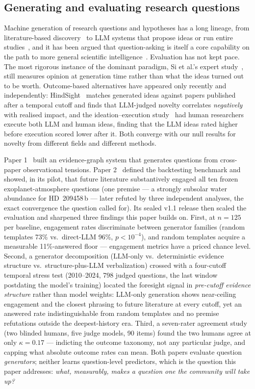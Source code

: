 \documentclass[11pt]{article}
\begin{document}
\subsection{Generating and evaluating research questions}

Machine generation of research questions and hypotheses has a long lineage,
from literature-based discovery~\cite{swanson1986} to LLM systems that
propose ideas or run entire studies~\cite{lu2024,wang2024,baek2024}, and it
has been argued that question-asking is itself a core capability on the path
to more general scientific intelligence~\cite{kitano2021}. Evaluation has
not kept pace. The most rigorous instance of the dominant paradigm, Si et
al.'s expert study~\cite{si2024}, still measures opinion at generation time
rather than what the ideas turned out to be worth. Outcome-based
alternatives have appeared only recently and independently:
HindSight~\cite{hindsight2026} matches generated ideas against papers
published after a temporal cutoff and finds that LLM-judged novelty
correlates \emph{negatively} with realised impact, and the
ideation--execution study~\cite{ideationgap2025} had human researchers
execute both LLM and human ideas, finding that the LLM ideas rated higher
before execution scored lower after it. Both converge with our null results
for novelty from different fields and different methods.

Paper 1~\cite{paper1} built an evidence-graph system that generates
questions from cross-paper observational tensions. Paper
2~\cite{paper2} defined the backtesting benchmark and showed, in its
pilot, that future literature substantively
engaged all ten frozen exoplanet-atmosphere questions (one premise ---
a strongly subsolar water abundance for HD~209458\,b --- later refuted
by three independent analyses, the exact convergence the question
called for). Its sealed v1.1 release then scaled the evaluation and
sharpened three findings this paper builds on. First, at $n=125$ per
baseline, engagement rates discriminate between generator families
(random templates 73\% vs.\ direct-LLM 96\%, $p<10^{-4}$), and random
templates acquire a measurable 11\%-answered floor --- engagement
metrics have a priced chance level. Second, a generator decomposition
(LLM-only vs.\ deterministic evidence structure vs.\ structure-plus-LLM
verbalization) crossed with a four-cutoff temporal stress test
(2010--2024, 798 judged questions, the last window postdating the
model's training) located the foresight signal in \emph{pre-cutoff
evidence structure} rather than model weights: LLM-only generation
shows near-ceiling engagement and the closest phrasing to future
literature at every cutoff, yet an answered rate indistinguishable from
random templates and no premise refutations outside the deepest-history
era. Third, a seven-rater agreement study (two blinded humans, five
judge models, 90 items) found the two humans agree at only
$\kappa=0.17$ --- indicting the outcome taxonomy, not any particular
judge, and capping what absolute outcome rates can mean. Both papers
evaluate question \emph{generators}; neither learns question-level
predictors, which is the question this paper addresses: \emph{what,
measurably, makes a question one the community will take up?}
\end{document}
